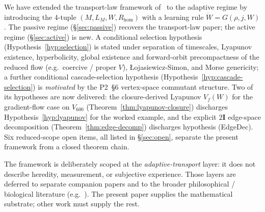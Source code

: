 \documentclass[11pt]{article}
\theoremstyle{definition}
\newcommand{\twoI}{2\mathbf{I}}
\begin{document}
We have extended the transport-law framework of~\citep{SmartTransportLaw} to the adaptive regime by introducing the 4-tuple $(M, L_M, W, R_{\mathrm{hom}})$ with a learning rule $\dot W = G(\rho, j, W)$. The passive regime (\S\ref{sec:passive}) recovers the transport-law paper; the active regime (\S\ref{sec:active}) is new. A conditional selection hypothesis (Hypothesis~\ref{hyp:selection}) is stated under separation of timescales, Lyapunov existence, hyperbolicity, global existence and forward-orbit precompactness of the reduced flow (e.g.\ coercive / proper $V$), {\L}ojasiewicz-Simon, and Morse genericity; a further conditional cascade-selection hypothesis (Hypothesis~\ref{hyp:cascade-selection}) is \emph{motivated} by the P2~\S 6 vertex-space commutant structure. Two of its hypotheses are now delivered: the closure-derived Lyapunov $V_f(W)$ for the gradient-flow case on $V_{600}$ (Theorem~\ref{thm:lyapunov-closure}) discharges Hypothesis~\ref{hyp:lyapunov} for the worked example, and the explicit $\twoI$ edge-space decomposition (Theorem~\ref{thm:edge-decomp}) discharges hypothesis (EdgeDec). Six reduced-scope open items, all listed in \S\ref{sec:open}, separate the present framework from a closed theorem chain.

The framework is deliberately scoped at the \emph{adaptive-transport} layer: it does not describe heredity, measurement, or subjective experience. Those layers are deferred to separate companion papers and to the broader philosophical / biological literature (e.g.~\citep{Hameroff1996, Levin2022}). The present paper supplies the mathematical substrate; other work must supply the rest.
\end{document}
